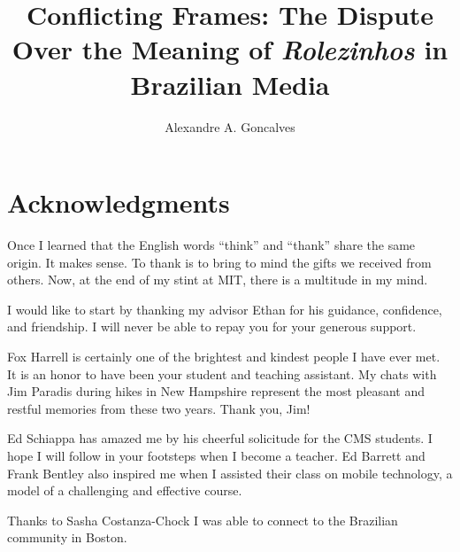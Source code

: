 \title{Conflicting Frames: The Dispute Over the Meaning of \emph{Rolezinhos} in Brazilian Media}
\author{Alexandre A. Goncalves}
\maketitle
\cleardoublepage
\begin{abstractpage}

\end{abstractpage}
\cleardoublepage
\section*{Acknowledgments}
Once I learned that the English words \enquote{think} and \enquote{thank} share the same origin. It makes sense. To thank is to bring to mind the gifts we received from others. Now, at the end of my stint at MIT, there is a multitude in my mind.

I would like to start by thanking my advisor Ethan for his guidance, confidence, and friendship. I will never be able to repay you for your generous support.

Fox Harrell is certainly one of the brightest and kindest people I have ever met. It is an honor to have been your student and teaching assistant. My chats with Jim Paradis during hikes in New Hampshire represent the most pleasant and restful memories from these two years. Thank you, Jim!

Ed Schiappa has amazed me by his cheerful solicitude for the CMS students. I hope I will follow in your footsteps when I become a teacher. Ed Barrett and Frank Bentley also inspired me when I assisted their class on mobile technology, a model of a challenging and effective course.

Thanks to Sasha Costanza-Chock I was able to connect to the Brazilian community in Boston.

